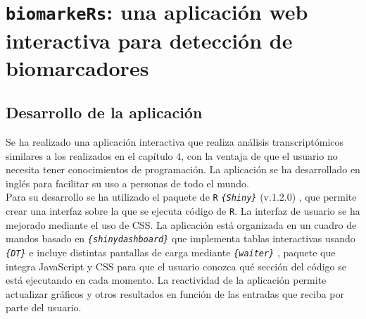 \chapter{\texttt{biomarkeRs}: una aplicación web interactiva para detección de biomarcadores}

\section{Desarrollo de la aplicación}

Se ha realizado una aplicación interactiva que realiza análisis transcriptómicos similares a los realizados en el capítulo 4, con la ventaja de que el usuario no necesita tener conocimientos de programación. La aplicación se ha desarrollado en inglés para facilitar su uso a personas de todo el mundo.\\

Para su desarrollo se ha utilizado el paquete de \texttt{R} \textit{\texttt{\{Shiny\}}} (v.1.2.0) \cite{Chang2020}, que permite crear una interfaz sobre la que se ejecuta código de \texttt{R}. La interfaz de usuario se ha mejorado mediante el uso de CSS. La aplicación está organizada en un cuadro de mandos basado en \textit{\texttt{\{shinydashboard\}}} \cite{Chang2018} que implementa tablas interactivas usando \textit{\texttt{\{DT\}}} \cite{Xie2020} e incluye distintas pantallas de carga mediante \textit{\texttt{\{waiter\}}} \cite{Coene2020}, paquete que integra JavaScript y CSS para que el usuario conozca qué sección del código se está ejecutando en cada momento. La reactividad de la aplicación permite actualizar gráficos y otros resultados en función de las entradas que reciba por parte del usuario. \\


